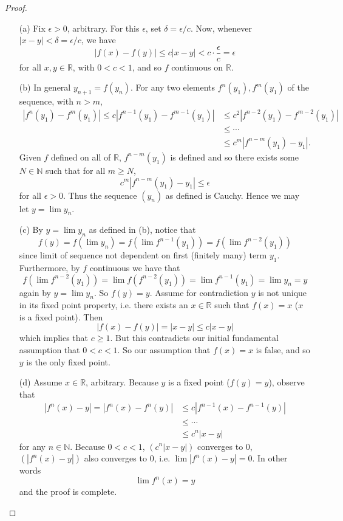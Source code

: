 \documentclass[11pt,twoside, reqno]{amsart}
\theoremstyle{remark}
\def\R{\mathbb R}
\def\N{\mathbb N}
\begin{document}
\begin{proof}
\begin{enumerate}
    \item [(a)] Fix $\epsilon > 0$, arbitrary. For this $\epsilon$, set $\delta = \epsilon / c$. Now, whenever $|x - y| < \delta = \epsilon / c$, we have
    $$
        |f(x) - f(y)| \leq c|x - y| < c \cdot \frac{\epsilon}{c} = \epsilon
    $$
    for all $x,y \in \R$, with $0 < c < 1$, and so $f$ continuous on $\R$.
    \item [(b)] In general $y_{n+1} = f(y_n)$. For any two elements $f^n(y_1),f^m(y_1)$ of the sequence, with $n > m$,
    \begin{align*}
        |f^n(y_1) - f^m(y_1)| \leq c|f^{n-1}(y_1) - f^{m-1}(y_1)| & \leq c^2|f^{n-2}(y_1) - f^{m-2}(y_1)| \\
        & \leq \cdots \\
        & \leq c^m|f^{n-m}(y_1) - y_1|.
    \end{align*}
    Given $f$ defined on all of $\R$, $f^{n-m}(y_1)$ is defined and so there exists some $N \in \N$ such that for all $m \geq N$,
    $$
        c^m|f^{n-m}(y_1) - y_1| \leq \epsilon
    $$
    for all $\epsilon > 0$. Thus the sequence $(y_n)$ as defined is Cauchy. Hence we may let $y = \lim y_n$.
    \item [(c)] By $y = \lim y_n$ as defined in (b), notice that
    $$
        f(y) = f(\lim y_n) = f(\lim f^{n-1}(y_1)) = f(\lim f^{n-2}(y_1))
    $$
    since limit of sequence not dependent on first (finitely many) term $y_1$. Furthermore, by $f$ continuous we have that
    $$
        f(\lim f^{n-2}(y_1)) = \lim f(f^{n-2}(y_1)) = \lim f^{n-1}(y_1) = \lim y_n = y
    $$
    again by $y = \lim y_n$. So $f(y) = y$. Assume for contradiction $y$ is not unique in its fixed point property, i.e. there exists an $x \in \R$ such that $f(x) = x$ ($x$ is a fixed point). Then
    $$
        |f(x) - f(y)| = |x - y| \leq c|x - y|
    $$
    which implies that $c \geq 1$. But this contradicts our initial fundamental assumption that $0 < c < 1$. So our assumption that $f(x) = x$ is false, and so $y$ is the only fixed point.
    \item [(d)] Assume $x \in \R$, arbitrary. Because $y$ is a fixed point ($f(y) = y$), observe that
    \begin{align*}
        |f^{n}(x) - y| = |f^{n}(x) - f^n(y)| & \leq c|f^{n-1}(x) - f^{n-1}(y)| \\
        & \leq \cdots \\
        & \leq c^n|x - y|
    \end{align*}
    for any $n \in \N$. Because $0 < c < 1$, $(c^n|x-y|)$ converges to $0$, $(|f^n(x) - y|)$ also converges to $0$, i.e. $\lim |f^n(x) - y| = 0$. In other words
    $$
        \lim f^n(x) = y
    $$
    and the proof is complete.
\end{enumerate}

\end{proof}
\end{document}
